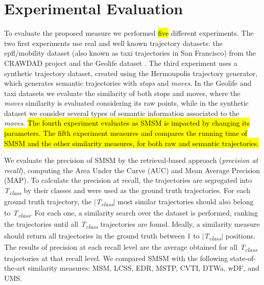 %



\chapter[Experiments]{Experimental Evaluation}\label{sec:experiments}

\begin{flushright}
     
\end{flushright}

To evaluate the proposed measure we performed \hl{five} different experiments. The two first experiments use real and well known trajectory datasets: the epfl/mobility dataset (also known as taxi trajectories in San Francisco) from the CRAWDAD project \cite{epfl-mobility-20090224} and the Geolife dataset \cite{zheng2009mining}. The third experiment uses a synthetic trajectory dataset, created using the Hermoupolis \cite{Pelekis-Hermoupolis} trajectory generator, which generates semantic trajectories with \emph{stops} and \emph{moves}. In the Geolife and taxi datasets we evaluate the similarity of both stops and moves, where the \emph{moves} similarity is evaluated considering its raw points, while in the synthetic dataset we consider several types of semantic information associated to the \emph{moves}. \hl{The fourth experiment evaluates as SMSM is impacted by changing its parameters. The fifth experiment measures and compares the running time of SMSM and the other similarity measures, for both raw and semantic trajectories.}

We evaluate the precision of SMSM by the retrieval-based approach (\textit{precision at recall}), computing the Area Under the Curve (AUC) and Mean Average Precision (MAP). To calculate the precision at recall, the trajectories are segregated into \textit{T\textsubscript{class}} by their classes and were used as the ground truth trajectories. For each ground truth trajectory, the $|$\textit{T\textsubscript{class}}$|$ most similar trajectories should also belong to \textit{T\textsubscript{class}}. For each one, a similarity search over the dataset is performed, ranking the trajectories until all \textit{T\textsubscript{class}} trajectories are found. Ideally, a similarity measure should return all trajectories in the ground truth between 1 to $|$\textit{T\textsubscript{class}}$|$ positions. The results of precision at each recall level are the average obtained for all \textit{T\textsubscript{class}} trajectories at that recall level. {We compared SMSM with the following state-of-the-art similarity measures: MSM, LCSS, EDR, MSTP, CVTI, DTWa, wDF, and UMS.}

